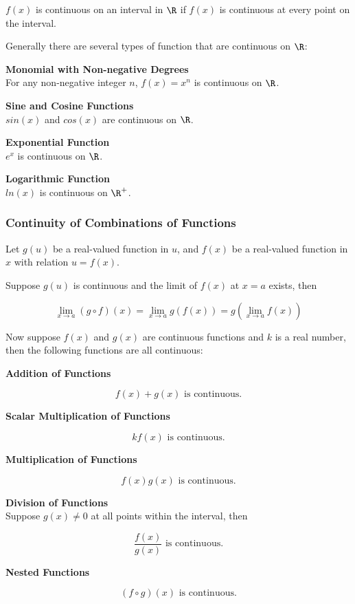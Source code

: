 $f(x)$ is continuous on an interval in $\R$ if $f(x)$ is continuous at every point on the interval.\n

Generally there are several types of function that are continuous on $\R$:
\begin{alist}
  \item \textbf{Monomial with Non-negative Degrees}\\
  For any non-negative integer $n$, $f(x)=x^{n}$ is continuous on $\R$.
  \item \textbf{Sine and Cosine Functions}\\
  $sin(x)$ and $cos(x)$ are continuous on $\R$.
  \item \textbf{Exponential Function}\\
  $e^{x}$ is continuous on $\R$.
  \item \textbf{Logarithmic Function}\\
  $ln(x)$ is continuous on $\R^{+}$.
\end{alist}

\subsubsection{Continuity of Combinations of Functions}
\begin{thm}
  Let $g(u)$ be a real-valued function in $u$, and $f(x)$ be a real-valued function in $x$ with relation $u=f(x)$.\n

  Suppose $g(u)$ is continuous and the limit of $f(x)$ at $x=a$ exists, then

  $$\lim_{x\to a}(g\circ f)(x)=\lim_{x\to a}g(f(x))=g(\lim_{x\to a}f(x))$$
\end{thm}\n

Now suppose $f(x)$ and $g(x)$ are continuous functions and $k$ is a real number, then the following functions are all continuous:

\begin{alist}
  \item \textbf{Addition of Functions}

  $$f(x)+g(x)\text{ is continuous.}$$

  \item \textbf{Scalar Multiplication of Functions}

  $$kf(x)\text{ is continuous.}$$

  \item \textbf{Multiplication of Functions}

  $$f(x)g(x)\text{ is continuous.}$$

  \item \textbf{Division of Functions}\\
  Suppose $g(x)\neq 0$ at all points within the interval, then

  $$\frac{f(x)}{g(x)}\text{ is continuous.}$$

  \item \textbf{Nested Functions}

  $$(f\circ g)(x)\text{ is continuous.}$$
\end{alist}

